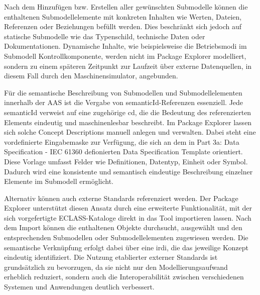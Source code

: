 Nach dem Hinzufügen bzw. Erstellen aller gewünschten Submodelle können die enthaltenen Submodellelemente mit konkreten Inhalten wie Werten, Dateien, Referenzen oder Beziehungen befüllt werden.
Dies beschränkt sich jedoch auf statische Submodelle wie das Typenschild, technische Daten oder Dokumentationen.
Dynamische Inhalte, wie beispielsweise die Betriebsmodi im Submodell Kontrollkomponente, werden nicht im Package Explorer modelliert, sondern zu einem späteren Zeitpunkt zur Laufzeit über externe Datenquellen, in diesem Fall durch den Maschinensimulator, angebunden.

Für die semantische Beschreibung von Submodellen und Submodellelementen innerhalb der AAS ist die Vergabe von semanticId-Referenzen essenziell.
Jede semanticId verweist auf eine zugehörige \acs{cd}, die die Bedeutung des referenzierten Elements eindeutig und maschinenlesbar beschreibt.
Im Package Explorer lassen sich solche Concept Descriptions manuell anlegen und verwalten.
Dabei steht eine vordefinierte Eingabemaske zur Verfügung, die sich an dem in Part 3a: Data Specification - IEC 61360 \cite{SpezifikationPart3a} defionierten Data Specification Template orientiert.
Diese Vorlage umfasst Felder wie Definitionen, Datentyp, Einheit oder Symbol.
Dadurch wird eine konsistente und semantisch eindeutige Beschreibung einzelner Elemente im Submodell ermöglicht.


Alternativ können auch externe Standards referenziert werden. 
Der Package Explorer unterstützt diesen Ansatz durch eine erweiterte Funktionalität, mit der sich vorgefertigte ECLASS-Kataloge direkt in das Tool importieren lassen. 
Nach dem Import können die enthaltenen Objekte durchsucht, ausgewählt und den entsprechenden Submodellen oder Submodellelementen zugewiesen werden. 
Die semantische Verknüpfung erfolgt dabei über eine \acs{irdi}, die das jeweilige Konzept eindeutig identifiziert. 
Die Nutzung etablierter externer Standards ist grundsätzlich zu bevorzugen, da sie nicht nur den Modellierungsaufwand erheblich reduziert, sondern auch die Interoperabilität zwischen verschiedenen Systemen und Anwendungen deutlich verbessert.

